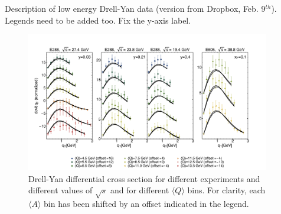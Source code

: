 \documentclass[aps,preprintnumbers,showpacs,nofootinbib,superscriptaddress,floatfix]{revtex4}
\begin{document}
Description of low energy Drell-Yan data (version from Dropbox, Feb. 9$^{th}$).
Legends need to be added too. Fix the y-axis label.
\begin{figure}[h!]
\centering
\includegraphics[width=0.95\textwidth]{plots/DY_SCIplot_flINDEP.pdf}
\caption{Drell-Yan differential cross section for different experiments and
  different values of $\sqrt{s}$ and for different $\langle Q \rangle$ bins.
  For clarity, each $\langle A \rangle$  bin has been shifted by an offset
  indicated in the legend.}
\label{f:DY_panel}
\end{figure}
%
%
%
\end{document}
